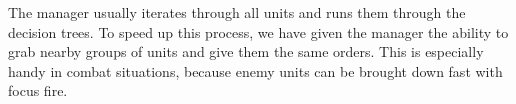 The manager usually iterates through all units and runs them through the decision trees. To speed up this process, we have given the manager the ability to grab nearby groups of units and give them the same orders. This is especially handy in combat situations, because enemy units can be brought down fast with focus fire.